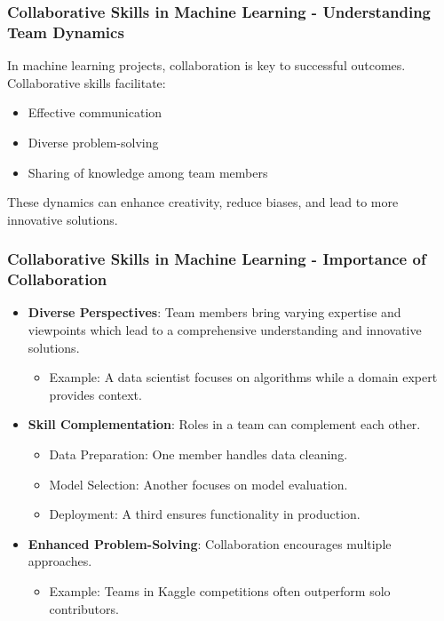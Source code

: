 \documentclass[aspectratio=169]{beamer}
\begin{document}
\begin{frame}[fragile]
    \frametitle{Collaborative Skills in Machine Learning - Understanding Team Dynamics}
    
    In machine learning projects, collaboration is key to successful outcomes. 
    Collaborative skills facilitate:
    \begin{itemize}
        \item Effective communication
        \item Diverse problem-solving
        \item Sharing of knowledge among team members
    \end{itemize}
    These dynamics can enhance creativity, reduce biases, and lead to more innovative solutions.
\end{frame}

\begin{frame}[fragile]
    \frametitle{Collaborative Skills in Machine Learning - Importance of Collaboration}
    
    \begin{itemize}
        \item \textbf{Diverse Perspectives}: Team members bring varying expertise and viewpoints which lead to a comprehensive understanding and innovative solutions.
            \begin{itemize}
                \item Example: A data scientist focuses on algorithms while a domain expert provides context.
            \end{itemize}
        
        \item \textbf{Skill Complementation}: Roles in a team can complement each other.
            \begin{itemize}
                \item Data Preparation: One member handles data cleaning.
                \item Model Selection: Another focuses on model evaluation.
                \item Deployment: A third ensures functionality in production.
            \end{itemize}
        
        \item \textbf{Enhanced Problem-Solving}: Collaboration encourages multiple approaches.
            \begin{itemize}
                \item Example: Teams in Kaggle competitions often outperform solo contributors.
            \end{itemize}
    \end{itemize}
\end{frame}
\end{document}
